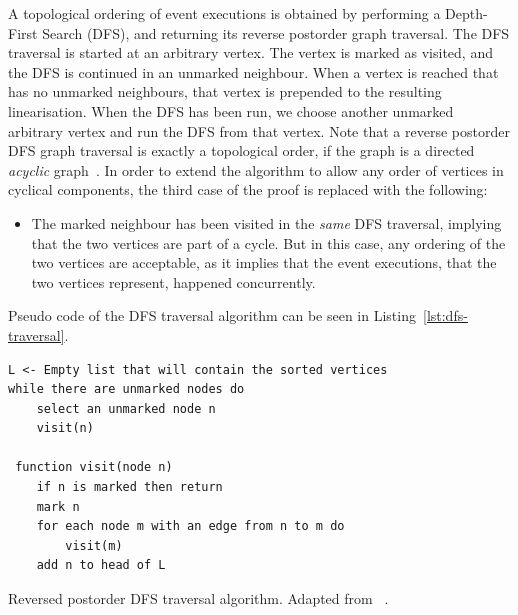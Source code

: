 \documentclass{article}
\begin{document}
	A topological ordering of event executions is obtained by performing a Depth-First Search (DFS), and returning its reverse postorder graph traversal.
	The DFS traversal is started at an arbitrary vertex.
	The vertex is marked as visited, and the DFS is continued in an unmarked neighbour.
	When a vertex is reached that has no unmarked neighbours, that vertex is prepended to the resulting linearisation.
	When the DFS has been run, we choose another unmarked arbitrary vertex and run the DFS from that vertex.
	Note that a reverse postorder DFS graph traversal is exactly a topological order, if the graph is a directed \textit{acyclic} graph~\cite[chapter 4, page 582]{sedgewick_algorithms_2011}.
	In order to extend the algorithm to allow any order of vertices in cyclical components, the third case of the proof is replaced with the following:
	\begin{itemize}
		\item The marked neighbour has been visited in the \textit{same} DFS traversal, implying that the two vertices are part of a cycle. But in this case, any ordering of the two vertices are acceptable, as it implies that the event executions, that the two vertices represent, happened concurrently.
	\end{itemize}
	Pseudo code of the DFS traversal algorithm can be seen in Listing~\ref{lst:dfs-traversal}.
\begin{snippet}
\begin{mdframed}[backgroundcolor=Papyrus]
	\begin{lstlisting}[style=pseudo, keywords={}]
L <- Empty list that will contain the sorted vertices
while there are unmarked nodes do
    select an unmarked node n
    visit(n)

 function visit(node n)
    if n is marked then return
    mark n
    for each node m with an edge from n to m do
        visit(m)
    add n to head of L
	\end{lstlisting}
\end{mdframed}
\caption{Reversed postorder DFS traversal algorithm. Adapted from~\cite{_topological_2018} \label{lst:dfs-traversal}.}
\end{snippet}
\end{document}
